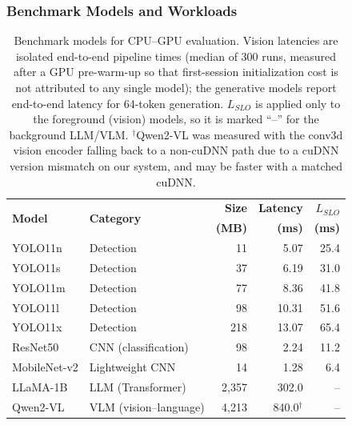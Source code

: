 \documentclass[conference]{IEEEtran}
\begin{document}
\subsubsection{Benchmark Models and Workloads}

\begin{table}
\centering
\caption{Benchmark models for CPU--GPU evaluation. \textcolor{navyblue}{Vision latencies are isolated end-to-end pipeline times (median of 300 runs, measured after a GPU pre-warm-up so that first-session initialization cost is not attributed to any single model); the generative models report end-to-end latency for 64-token generation. $L_{SLO}$ is applied only to the foreground (vision) models, so it is marked ``--'' for the background LLM/VLM. $^{\dagger}$Qwen2-VL was measured with the conv3d vision encoder falling back to a non-cuDNN path due to a cuDNN version mismatch on our system, and may be faster with a matched cuDNN.}}
\label{tab:gpu_models}
\begin{tabular}{@{}l l r r r@{}}
\hline
\multirow{2}{*}{\textbf{Model}} & \multirow{2}{*}{\textbf{Category}} & \textbf{Size} & \textbf{Latency} & \textbf{$L_{SLO}$} \\
 &  & \textbf{(MB)} & \textbf{(ms)} & \textbf{(ms)} \\
\hline
YOLO11n & Detection & \textcolor{navyblue}{11} & \textcolor{navyblue}{5.07} & \textcolor{navyblue}{25.4} \\
YOLO11s & Detection & \textcolor{navyblue}{37} & \textcolor{navyblue}{6.19} & \textcolor{navyblue}{31.0} \\
YOLO11m & Detection & \textcolor{navyblue}{77} & \textcolor{navyblue}{8.36} & \textcolor{navyblue}{41.8} \\
YOLO11l & Detection & \textcolor{navyblue}{98} & \textcolor{navyblue}{10.31} & \textcolor{navyblue}{51.6} \\
YOLO11x & Detection & \textcolor{navyblue}{218} & \textcolor{navyblue}{13.07} & \textcolor{navyblue}{65.4} \\
ResNet50 & CNN (classification) & \textcolor{navyblue}{98} & \textcolor{navyblue}{2.24} & \textcolor{navyblue}{11.2} \\
MobileNet-v2 & Lightweight CNN & \textcolor{navyblue}{14} & \textcolor{navyblue}{1.28} & \textcolor{navyblue}{6.4} \\
LLaMA-1B & LLM (Transformer) & \textcolor{navyblue}{2{,}357} & \textcolor{navyblue}{302.0} & \textcolor{navyblue}{--} \\
Qwen2-VL & VLM (vision--language) & \textcolor{navyblue}{4{,}213} & \textcolor{navyblue}{840.0$^{\dagger}$} & \textcolor{navyblue}{--} \\
\hline
\end{tabular}
\end{table}
\end{document}
